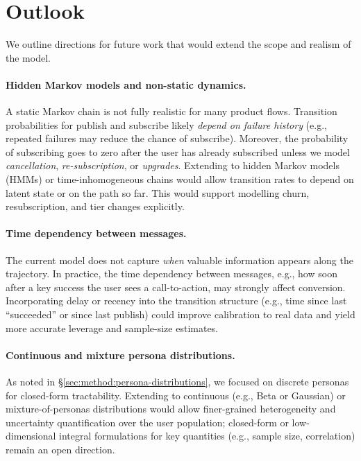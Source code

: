 \section{Outlook}
\label{sec:outlook}

We outline directions for future work that would extend the scope and realism of the model.

\paragraph{Hidden Markov models and non-static dynamics.}
A static Markov chain is not fully realistic for many product flows. Transition probabilities for publish and subscribe likely \emph{depend on failure history} (e.g., repeated failures may reduce the chance of subscribe). Moreover, the probability of subscribing goes to zero after the user has already subscribed unless we model \emph{cancellation}, \emph{re-subscription}, or \emph{upgrades}. Extending to hidden Markov models (HMMs) or time-inhomogeneous chains would allow transition rates to depend on latent state or on the path so far. This would support modelling churn, resubscription, and tier changes explicitly.

\paragraph{Time dependency between messages.}
The current model does not capture \emph{when} valuable information appears along the trajectory. In practice, the time dependency between messages, e.g., how soon after a key success the user sees a call-to-action, may strongly affect conversion. Incorporating delay or recency into the transition structure (e.g., time since last ``succeeded'' or since last publish) could improve calibration to real data and yield more accurate leverage and sample-size estimates.

\paragraph{Continuous and mixture persona distributions.}
As noted in \S\ref{sec:method:persona-distributions}, we focused on discrete personas for closed-form tractability. Extending to continuous (e.g., Beta or Gaussian) or mixture-of-personas distributions would allow finer-grained heterogeneity and uncertainty quantification over the user population; closed-form or low-dimensional integral formulations for key quantities (e.g., sample size, correlation) remain an open direction.

